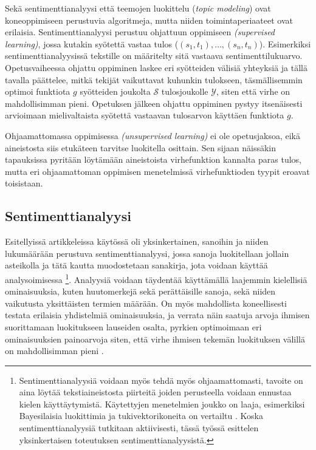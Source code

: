 \documentclass[finnish,gradu,twoside,12pt]{tktltiki}
\begin{document}
{Sekä sentimenttianalyysi että teemojen luokittelu (\textit{topic modeling}) ovat koneoppimiseen perustuvia algoritmeja, mutta niiden toimintaperiaateet ovat erilaisia. Sentimenttianalyysi perustuu ohjattuun oppimiseen \textit{(supervised learning)}, jossa kutakin syötettä vastaa tulos (${ (s_1, t_1), \ldots , (s_n, t_n) }$). Esimerkiksi sentimenttianalyysissä tekstille on määritelty sitä vastaava sentimenttilukuarvo. Opetusvaiheessa ohjattu oppiminen laskee eri syötteiden välisiä yhteyksiä ja tällä tavalla päättelee, mitkä tekijät vaikuttavat kuhunkin tulokseen, täsmällisemmin optimoi funktiota $g$ syötteiden joukolta $\mathcal{S}$ tulosjoukolle $\mathcal{Y}$, siten että virhe on mahdollisimman pieni. Opetuksen jälkeen ohjattu oppiminen pystyy itsenäisesti arvioimaan mielivaltaista syötettä vastaavan tulosarvon käyttäen funktiota $g$.

Ohjaamattomassa oppimisessa \textit{(unsupervised learning)} ei ole opetusjaksoa, eikä aineistosta siis etukäteen tarvitse luokitella osittain. Sen sijaan näissäkin tapauksissa pyritään löytämään aineistoista virhefunktion kannalta paras tulos, mutta eri ohjaamattoman oppimisen menetelmissä virhefunktioden tyypit eroavat toisistaan.

\subsection{Sentimenttianalyysi}

Esitellyissä artikkeleissa käytössä oli yksinkertainen, sanoihin ja niiden lukumäärään perustuva sentimenttianalyysi, jossa sanoja luokitellaan jollain asteikolla ja tätä kautta muodostetaan sanakirja, jota voidaan käyttää analysoimisessa \citep{pennebaker2001linguistic,Thelwall2010}\footnote{Sentimenttianalyysiä voidaan myös tehdä myös ohjaamattomasti, tavoite on aina löytää tekstiaineistosta piirteitä joiden perusteella voidaan ennustaa kielen käyttäytymistä. Käytettyjen menetelmien joukko on laaja, esimerkiksi Bayesilaisia luokittimia ja tukivektorikoneita on vertailtu \citep{Pang02a,Pang05a,Thelwall2010}. Koska sentimenttianalyysiä tutkitaan aktiivisesti, tässä työssä esittelen yksinkertaisen toteutuksen sentimenttianalyysistä.}. Analyysiä voidaan täydentää käyttämällä laajemmin kielellisiä ominaisuuksia, kuten huutomerkejä sekä perättäisille sanoja, sekä niiden vaikutusta yksittäisten termien määrään. On myös mahdollista koneellisesti testata erilaisia yhdistelmiä ominaisuuksia, ja verrata näin saatuja arvoja ihmisen suorittamaan luokitukseen lauseiden osalta, pyrkien optimoimaan eri ominaisuuksien painoarvoja siten, että virhe ihmisen tekemän luokituksen välillä on mahdollisimman pieni \citep{Thelwall2010}.

}
\end{document}
